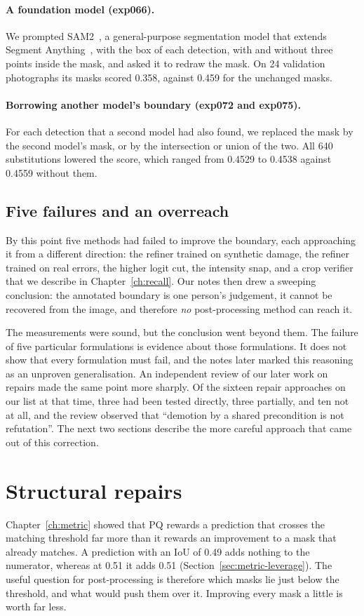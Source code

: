 \paragraph{A foundation model (exp066).} We prompted SAM2~\citep{ravi2024sam2}, a general-purpose
segmentation model that extends Segment Anything~\citep{sam}, with the box of each detection, with and without three points inside the mask, and
asked it to redraw the mask. On 24 validation photographs its masks scored 0.358, against 0.459 for
the unchanged masks.

\paragraph{Borrowing another model's boundary (exp072 and exp075).} For each detection that a second
model had also found, we replaced the mask by the second model's mask, or by the intersection or union
of the two. All 640 substitutions lowered the score, which ranged from 0.4529 to 0.4538 against
0.4559 without them.

\subsection{Five failures and an overreach}\label{sec:post-overreach}
By this point five methods had failed to improve the boundary, each approaching it from a different
direction: the refiner trained on synthetic damage, the refiner trained on real errors, the higher
logit cut, the intensity snap, and a crop verifier that we describe in Chapter~\ref{ch:recall}. Our
notes then drew a sweeping conclusion: the annotated boundary is one person's judgement, it cannot be
recovered from the image, and therefore \emph{no} post-processing method can reach it.

The measurements were sound, but the conclusion went beyond them. The failure of five particular
formulations is evidence about those formulations. It does not show that every formulation must
fail, and the notes later marked this reasoning as an unproven generalisation. An independent review
of our later work on repairs made the same point more sharply. Of the sixteen repair approaches on
our list at that time, three had been tested directly, three partially, and ten not at all, and the
review observed that ``demotion by a shared precondition is not refutation''. The next two sections
describe the more careful approach that came out of this correction.

\section{Structural repairs}\label{sec:post-structure}
Chapter~\ref{ch:metric} showed that PQ rewards a prediction that crosses the matching threshold far
more than it rewards an improvement to a mask that already matches. A prediction with an IoU of 0.49
adds nothing to the numerator, whereas at 0.51 it adds 0.51 (Section~\ref{sec:metric-leverage}). The
useful question for post-processing is therefore which masks lie just below the threshold, and what
would push them over it. Improving every mask a little is worth far less.

